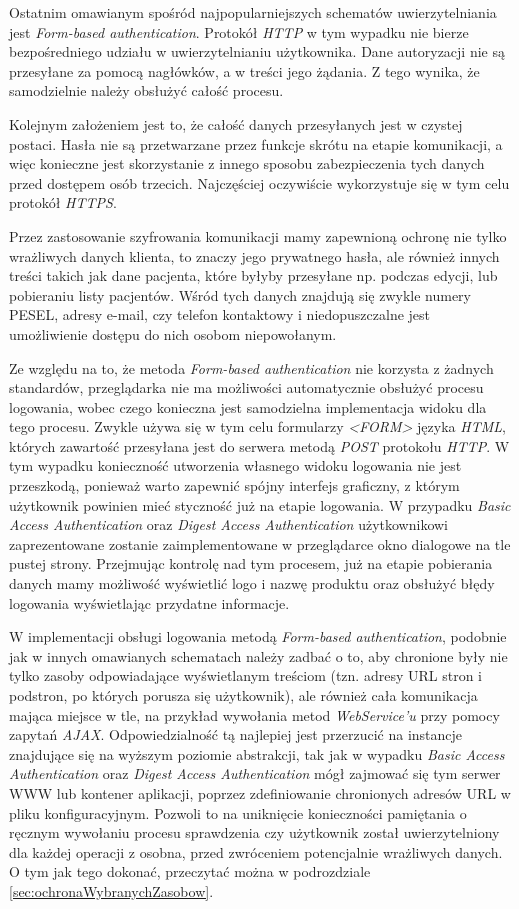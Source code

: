 \documentclass[11pt]{aghdpl}
\begin{document}
Ostatnim omawianym spośród najpopularniejszych schematów uwierzytelniania jest \emph{Form-based authentication}. Protokół \emph{HTTP} w tym wypadku nie bierze bezpośredniego udziału w uwierzytelnianiu użytkownika. Dane autoryzacji nie są przesyłane za pomocą nagłówków, a w treści jego żądania. Z tego wynika, że samodzielnie należy obsłużyć całość procesu.

Kolejnym założeniem jest to, że całość danych przesyłanych jest w czystej postaci. Hasła nie są przetwarzane przez funkcje skrótu na etapie komunikacji, a więc konieczne jest skorzystanie z innego sposobu zabezpieczenia tych danych przed dostępem osób trzecich. Najczęściej oczywiście wykorzystuje się w tym celu protokół \emph{HTTPS}.

Przez zastosowanie szyfrowania komunikacji mamy zapewnioną ochronę nie tylko wrażliwych danych klienta, to znaczy jego prywatnego hasła, ale również innych treści takich jak dane pacjenta, które byłyby przesyłane np. podczas edycji, lub pobieraniu listy pacjentów. Wśród tych danych znajdują się zwykle numery PESEL, adresy e-mail, czy telefon kontaktowy i niedopuszczalne jest umożliwienie dostępu do nich osobom niepowołanym.

Ze względu na to, że metoda \emph{Form-based authentication} nie korzysta z żadnych standardów, przeglądarka nie ma możliwości automatycznie obsłużyć procesu logowania, wobec czego konieczna jest samodzielna implementacja widoku dla tego procesu. Zwykle używa się w tym celu formularzy \emph{<FORM>} języka \emph{HTML}, których zawartość przesyłana jest do serwera metodą \emph{POST} protokołu \emph{HTTP}. W tym wypadku konieczność utworzenia własnego widoku logowania nie jest przeszkodą, ponieważ warto zapewnić spójny interfejs graficzny, z którym użytkownik powinien mieć styczność już na etapie logowania. W przypadku \emph{Basic Access Authentication} oraz \emph{Digest Access Authentication} użytkownikowi zaprezentowane zostanie zaimplementowane w przeglądarce okno dialogowe na tle pustej strony. Przejmując kontrolę nad tym procesem, już na etapie pobierania danych mamy możliwość wyświetlić logo i nazwę produktu oraz obsłużyć błędy logowania wyświetlając przydatne informacje.

W implementacji obsługi logowania metodą \emph{Form-based authentication}, podobnie jak w innych omawianych schematach należy zadbać o to, aby chronione były nie tylko zasoby odpowiadające wyświetlanym treściom (tzn. adresy URL stron i podstron, po których porusza się użytkownik), ale również cała komunikacja mająca miejsce w tle, na przykład wywołania metod \emph{WebService'u} przy pomocy zapytań \emph{AJAX}. Odpowiedzialność tą najlepiej jest przerzucić na instancje znajdujące się na wyższym poziomie abstrakcji, tak jak w wypadku \emph{Basic Access Authentication} oraz \emph{Digest Access Authentication} mógł zajmować się tym serwer WWW lub kontener aplikacji, poprzez zdefiniowanie chronionych adresów URL w pliku konfiguracyjnym. Pozwoli to na uniknięcie konieczności pamiętania o ręcznym wywołaniu procesu sprawdzenia czy użytkownik został uwierzytelniony dla każdej operacji z osobna, przed zwróceniem potencjalnie wrażliwych danych. O tym jak tego dokonać, przeczytać można w podrozdziale \ref{sec:ochronaWybranychZasobow}.
\end{document}
